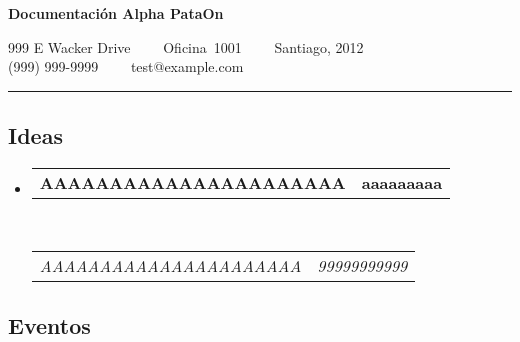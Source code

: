 \documentclass[10pt,letterpaper]{article}
\makeatletter
\newcommand{\headerrow}[2]
{\begin{tabular*}{\linewidth}{l@{\extracolsep{\fill}}r}
	#1 &
	#2 \\
\end{tabular*}}
\makeatother
\begin{document}
\begin{center}
{\LARGE \textbf{Documentación Alpha PataOn}}

999 E Wacker Drive\ \ \textbullet
\ \ Oficina\ 1001\ \ \textbullet
\ \ Santiago, 2012
\\
(999) 999-9999\ \ \textbullet
\ \ test@example.com
\end{center}

\hrule
\vspace{-0.4em}
\subsection*{Ideas}

\begin{itemize}
	\parskip=0.1em

	\item
	\headerrow
		{\textbf{AAAAAAAAAAAAAAAAAAAAAA}}
		{\textbf{aaaaaaaaa}}
	\\
	\headerrow
		{\emph{AAAAAAAAAAAAAAAAAAAAAA}}
		{\emph{99999999999}}

\end{itemize}

\subsection*{Eventos}
\end{document}
